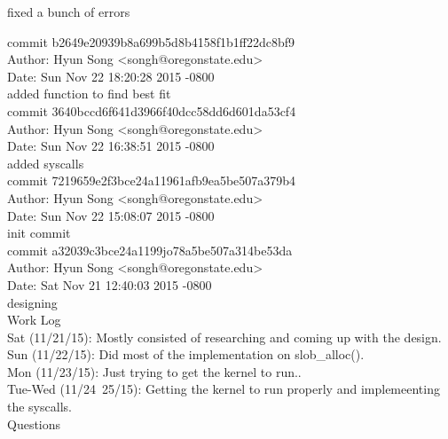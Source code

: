 \documentclass[letterpaper,10pt]{article}
\begin{document}
    fixed a bunch of errors\

commit b2649e20939b8a699b5d8b4158f1b1ff22dc8bf9\\
Author: Hyun Song <songh@oregonstate.edu>\\
Date:   Sun Nov 22 18:20:28 2015 -0800\\

    added function to find best fit\\

commit 3640bccd6f641d3966f40dcc58dd6d601da53cf4\\
Author: Hyun Song <songh@oregonstate.edu>\\
Date:   Sun Nov 22 16:38:51 2015 -0800\\

    added syscalls\\

commit 7219659e2f3bce24a11961afb9ea5be507a379b4\\
Author: Hyun Song <songh@oregonstate.edu>\\
Date:   Sun Nov 22 15:08:07 2015 -0800\\

    init commit\\

commit a32039c3bce24a1199jo78a5be507a314be53da\\
Author: Hyun Song <songh@oregonstate.edu>\\
Date:   Sat  Nov 21 12:40:03 2015 -0800\\

    designing\\



{\LARGE Work Log}\\

Sat (11/21/15): Mostly consisted of researching and coming up with the design.\\

Sun (11/22/15): Did most of the implementation on slob\_alloc().\\

Mon (11/23/15): Just trying to get the kernel to run..\\

Tue-Wed (11/24~25/15): Getting the kernel to run properly and implemeenting the syscalls.\\

{\LARGE Questions}\\
\end{document}
